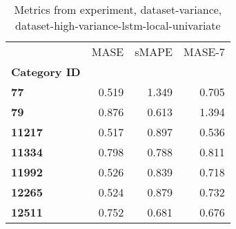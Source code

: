 \begin{table}[h]
\centering
\caption{Metrics from experiment, dataset-variance, dataset-high-variance-lstm-local-univariate}
\label{table:dataset-high-variance-lstm-local-univariate-dataset-variance}
\begin{tabular}{lrrr}
\toprule
{} &   MASE &  sMAPE &  MASE-7 \\
\textbf{Category ID} &        &        &         \\
\midrule
\textbf{77         } &  0.519 &  1.349 &   0.705 \\
\textbf{79         } &  0.876 &  0.613 &   1.394 \\
\textbf{11217      } &  0.517 &  0.897 &   0.536 \\
\textbf{11334      } &  0.798 &  0.788 &   0.811 \\
\textbf{11992      } &  0.526 &  0.839 &   0.718 \\
\textbf{12265      } &  0.524 &  0.879 &   0.732 \\
\textbf{12511      } &  0.752 &  0.681 &   0.676 \\
\bottomrule
\end{tabular}
\end{table}
